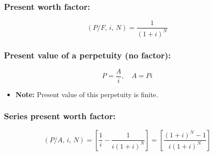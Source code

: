     \subsubsection{Present worth factor:}
    \begin{definition}
        \begin{equation}
            \left(P/F, \, i, \, N\right) = \frac{1}{(1+i)^N}
        \end{equation}            
    \end{definition}

    \subsubsection{Present value of a perpetuity (no factor):}
    \begin{definition}
        \begin{equation}
            P = \frac{A}{i}, \quad A = Pi
        \end{equation}
        \begin{itemize}
            \item \textbf{Note:} Present value of this perpetuity is finite.
        \end{itemize}
    \end{definition}

    \subsubsection{Series present worth factor:}
    \begin{definition}
        \begin{equation}
            \left(P/A, \, i, \, N\right) = \left[\frac{1}{i} - \frac{1}{i(1+i)^N}\right] = \left[\frac{(1+i)^N - 1}{i(1+i)^N}\right]
        \end{equation}
    \end{definition}

